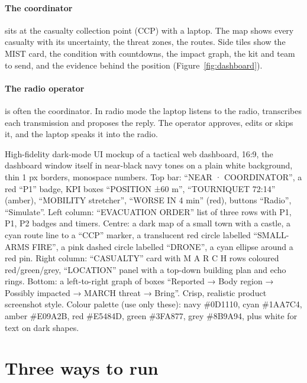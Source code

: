 \paragraph{The coordinator} sits at the casualty collection point (CCP) with a laptop. The map shows
every casualty with its uncertainty, the threat zones, the routes. Side tiles show the MIST card,
the condition with countdowns, the impact graph, the kit and team to send, and the evidence behind
the position (Figure~\ref{fig:dashboard}).

\paragraph{The radio operator} is often the coordinator. In radio mode the laptop listens to the
radio, transcribes each transmission and proposes the reply. The operator approves, edits or
skips it, and the laptop speaks it into the radio.

{High-fidelity dark-mode UI mockup of a tactical web dashboard, 16:9, the dashboard window itself in near-black navy tones on a plain white background,
thin 1 px borders, monospace numbers. Top bar: ``NEAR · COORDINATOR'', a red ``P1'' badge, KPI boxes
``POSITION ±60 m'', ``TOURNIQUET 72:14'' (amber), ``MOBILITY stretcher'', ``WORSE IN 4 min'' (red), buttons
``Radio'', ``Simulate''. Left column: ``EVACUATION ORDER'' list of three rows with P1, P1, P2 badges and timers.
Centre: a dark map of a small town with a castle, a cyan route line to a ``CCP'' marker, a translucent red circle
labelled ``SMALL-ARMS FIRE'', a pink dashed circle labelled ``DRONE'', a cyan ellipse around a red pin. Right
column: ``CASUALTY'' card with M A R C H rows coloured red/green/grey, ``LOCATION'' panel with a top-down building
plan and echo rings. Bottom: a left-to-right graph of boxes ``Reported → Body region → Possibly impacted → MARCH
threat → Bring''. Crisp, realistic product screenshot style. Colour palette (use only these): navy \#0D1110, cyan \#1AA7C4, amber \#E09A2B, red \#E5484D, green \#3FA877, grey \#8B9A94, plus white for text on dark shapes.}

\section{Three ways to run}

